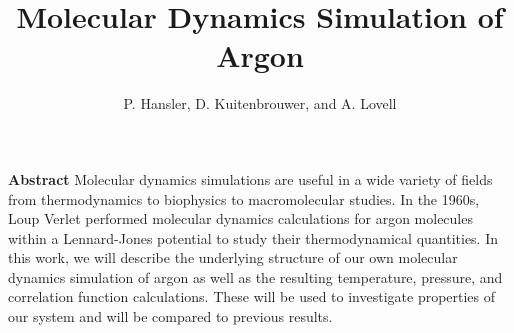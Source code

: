 \documentclass{article}
\begin{document}
\title{Molecular Dynamics Simulation of Argon}
\author{P. Hansler, D. Kuitenbrouwer, and A. Lovell}
\maketitle

\noindent \textbf{Abstract}  Molecular dynamics simulations are useful in a wide variety of fields from thermodynamics to biophysics to macromolecular studies.  In the 1960s, Loup Verlet performed molecular dynamics calculations for argon molecules within a Lennard-Jones potential to study their thermodynamical quantities.  In this work, we will describe the underlying structure of our own molecular dynamics simulation of argon as well as the resulting temperature, pressure, and correlation function calculations.  These will be used to investigate properties of our system and will be compared to previous results.  \\
\end{document}
